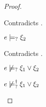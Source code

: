 \begin{proof}
\begin{byCases}
\begin{byCases}
\begin{byCases}
\begin{pfsteps*}
            \end{pfsteps*}
            Contradicts .
        \item[\text{(\ref{rule:CMSOr2})}]
            \begin{pfsteps*}
            \item $e \models_{?} \xi_2$ 
            \end{pfsteps*}
            Contradicts .
        \end{byCases}
        \begin{pfsteps*}
        \item $e \not\models_{?} \xi_1 \vee \xi_2$  
        \item $e \not\models_{?}^{\dag} \xi_1 \vee \xi_2$ 
        \end{pfsteps*}
        

\end{byCases}
\end{byCases}
\end{proof}
